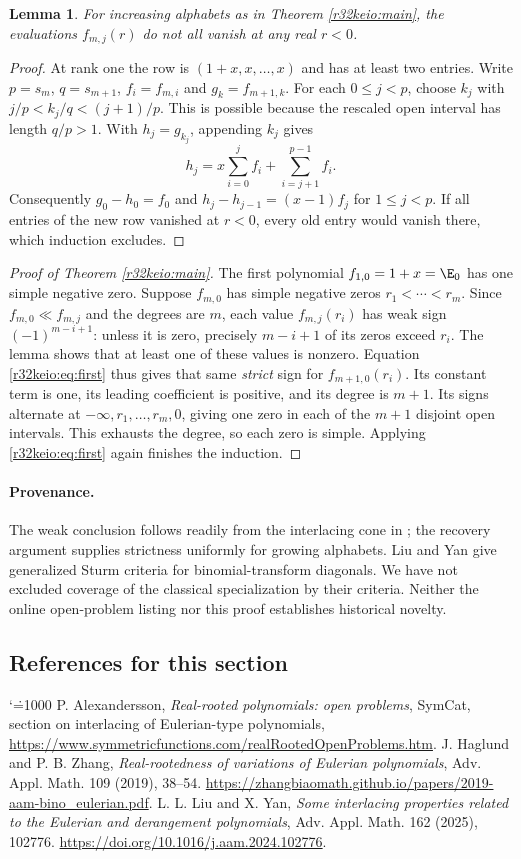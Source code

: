 \documentclass[11pt,a4paper]{article}
\makeatletter
\numberwithin{equation}{section}
\newtheorem{lemma}[theorem]{Lemma}
\theoremstyle{definition}
\theoremstyle{remark}
\renewenvironment{thebibliography}[1]
 {\subsection*{References for this section}\small
  \list{\@biblabel{\@arabic\c@enumiv}}
       {\settowidth\labelwidth{\@biblabel{#1}}\leftmargin\labelwidth
        \advance\leftmargin\labelsep\@openbib@code
        \usecounter{enumiv}\let\p@enumiv\@empty
        \renewcommand\theenumiv{\@arabic\c@enumiv}}
  \sloppy\clubpenalty4000\widowpenalty4000\sfcode`\.=1000\relax}
 {\def\@noitemerr{\@latex@warning{Empty bibliography}}\endlist}
\makeatother
\begin{document}
\begin{lemma}
For increasing alphabets as in Theorem \ref{r32keio:main}, the evaluations $f_{m,j}(r)$ do not all vanish at any real $r<0$.
\end{lemma}
\begin{proof}
At rank one the row is $(1+x,x,\ldots,x)$ and has at least two entries. Write $p=s_m$, $q=s_{m+1}$, $f_i=f_{m,i}$ and $g_k=f_{m+1,k}$. For each $0\le j<p$, choose $k_j$ with $j/p<k_j/q<(j+1)/p$. This is possible because the rescaled open interval has length $q/p>1$. With $h_j=g_{k_j}$, appending $k_j$ gives
\[
 h_j=x\sum_{i=0}^j f_i+\sum_{i=j+1}^{p-1}f_i.
\]
Consequently $g_0-h_0=f_0$ and $h_j-h_{j-1}=(x-1)f_j$ for $1\le j<p$. If all entries of the new row vanished at $r<0$, every old entry would vanish there, which induction excludes.
\end{proof}
\begin{proof}[Proof of Theorem \ref{r32keio:main}]
The first polynomial $f_{1,0}=1+x=\E_0$ has one simple negative zero. Suppose $f_{m,0}$ has simple negative zeros $r_1<\cdots<r_m$. Since $f_{m,0}\ll f_{m,j}$ and the degrees are $m$, each value $f_{m,j}(r_i)$ has weak sign $(-1)^{m-i+1}$: unless it is zero, precisely $m-i+1$ of its zeros exceed $r_i$. The lemma shows that at least one of these values is nonzero. Equation \eqref{r32keio:eq:first} thus gives that same \emph{strict} sign for $f_{m+1,0}(r_i)$. Its constant term is one, its leading coefficient is positive, and its degree is $m+1$. Its signs alternate at $-\infty,r_1,\ldots,r_m,0$, giving one zero in each of the $m+1$ disjoint open intervals. This exhausts the degree, so each zero is simple. Applying \eqref{r32keio:eq:first} again finishes the induction.
\end{proof}
\paragraph{Provenance.}
The weak conclusion follows readily from the interlacing cone in \cite{r32keio:hz}; the recovery argument supplies strictness uniformly for growing alphabets. Liu and Yan \cite{r32keio:ly} give generalized Sturm criteria for binomial-transform diagonals. We have not excluded coverage of the classical specialization by their criteria. Neither the online open-problem listing nor this proof establishes historical novelty.
\begin{thebibliography}{9}
 P. Alexandersson, \emph{Real-rooted polynomials: open problems}, SymCat, section on interlacing of Eulerian-type polynomials, \url{https://www.symmetricfunctions.com/realRootedOpenProblems.htm}.
 J. Haglund and P. B. Zhang, \emph{Real-rootedness of variations of Eulerian polynomials}, Adv. Appl. Math. 109 (2019), 38--54. \url{https://zhangbiaomath.github.io/papers/2019-aam-bino_eulerian.pdf}.
 L. L. Liu and X. Yan, \emph{Some interlacing properties related to the Eulerian and derangement polynomials}, Adv. Appl. Math. 162 (2025), 102776. \url{https://doi.org/10.1016/j.aam.2024.102776}.
\end{thebibliography}
\end{document}
